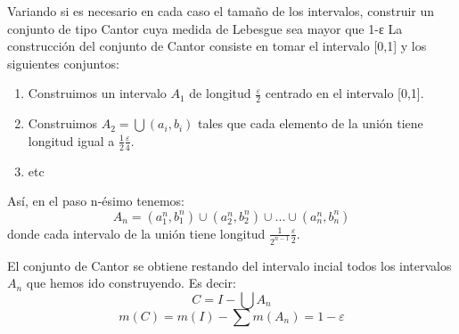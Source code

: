 \begin{problem}
Variando si es necesario en cada caso el tamaño de los intervalos, construir un conjunto de tipo Cantor cuya medida de Lebesgue sea mayor que 1-ε
\solution
La construcción del conjunto de Cantor consiste en tomar el intervalo [0,1] y los siguientes conjuntos:
\begin{enumerate}
\item Construimos un intervalo $A_1$ de longitud $\frac{ε}{2}$ centrado en el intervalo [0,1].
\item Construimos $A_2 = \bigcup (a_i, b_i)$ tales que cada elemento de la unión tiene longitud igual a $\frac{1}{2}\frac{ε}{4}$.
\item etc
\end{enumerate}
Así, en el paso n-ésimo tenemos:
\[A_n = (a_1^n,b_1^n) \cup (a_2^n,b_2^n) \cup ... \cup (a_n^n,b_n^n)\]
donde cada intervalo de la unión tiene longitud $\frac{1}{2^{n-1}}\frac{ε}{2}$.

El conjunto de Cantor se obtiene restando del intervalo incial todos los intervalos $A_n$ que hemos ido construyendo. Es decir:
\[C = I -\bigcup A_n\]
\[m(C)=m(I)-\sum m(A_n) = 1 - ε\]
\end{problem}

